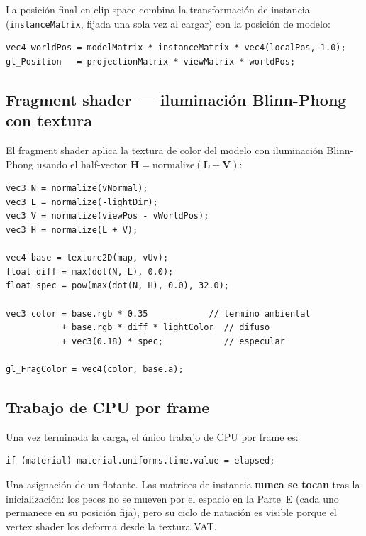\documentclass[12pt,a4paper]{article}
\begin{document}
La posición final en clip space combina la transformación de instancia
(\texttt{instanceMatrix}, fijada una sola vez al cargar) con la posición de modelo:

\begin{lstlisting}[style=glsl, language={}]
vec4 worldPos = modelMatrix * instanceMatrix * vec4(localPos, 1.0);
gl_Position   = projectionMatrix * viewMatrix * worldPos;
\end{lstlisting}

\subsection{Fragment shader — iluminación Blinn-Phong con textura}

El fragment shader aplica la textura de color del modelo con iluminación
Blinn-Phong usando el half-vector $\mathbf{H} = \text{normalize}(\mathbf{L} + \mathbf{V})$:

\begin{lstlisting}[style=glsl, language={}]
vec3 N = normalize(vNormal);
vec3 L = normalize(-lightDir);
vec3 V = normalize(viewPos - vWorldPos);
vec3 H = normalize(L + V);

vec4 base = texture2D(map, vUv);
float diff = max(dot(N, L), 0.0);
float spec = pow(max(dot(N, H), 0.0), 32.0);

vec3 color = base.rgb * 0.35            // termino ambiental
           + base.rgb * diff * lightColor  // difuso
           + vec3(0.18) * spec;            // especular

gl_FragColor = vec4(color, base.a);
\end{lstlisting}

\subsection{Trabajo de CPU por frame}

Una vez terminada la carga, el único trabajo de CPU por frame es:

\begin{lstlisting}[style=glsl, language={}]
if (material) material.uniforms.time.value = elapsed;
\end{lstlisting}

Una asignación de un flotante. Las matrices de instancia \textbf{nunca se tocan}
tras la inicialización: los peces no se mueven por el espacio en la Parte~E
(cada uno permanece en su posición fija), pero su ciclo de natación es visible
porque el vertex shader los deforma desde la textura VAT.
\end{document}
